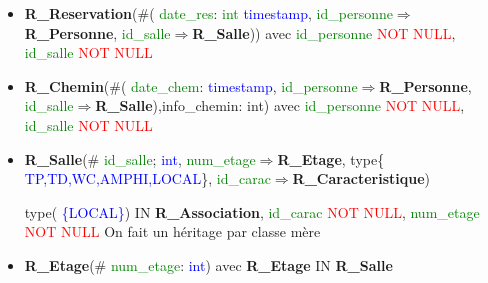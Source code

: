 \documentclass{article}
\begin{document}
\begin{itemize}
\item \textbf{R\_Reservation}(\#(\textcolor{green}{ date\_res}:\textcolor{green}{ int} \textcolor{blue}{ timestamp},\textcolor{green}{ id\_personne}$\Rightarrow$\textbf{R\_Personne},\textcolor{green}{ id\_salle}$\Rightarrow$\textbf{R\_Salle})) avec \textcolor{green}{ id\_personne} \textcolor{red}{NOT NULL},  \textcolor{green}{ id\_salle} \textcolor{red}{NOT NULL} \\

\item \textbf{R\_Chemin}(\#(\textcolor{green}{ date\_chem}: \textcolor{blue}{ timestamp},\textcolor{green}{ id\_personne}$\Rightarrow$\textbf{R\_Personne},\textcolor{green}{ id\_salle}$\Rightarrow$\textbf{R\_Salle}),info\_chemin: int) avec \textcolor{green}{ id\_personne} \textcolor{red}{NOT NULL}, \textcolor{green}{ id\_salle} \textcolor{red}{NOT NULL} \\

\item \textbf{R\_Salle}(\#\textcolor{green}{ id\_salle}; \textcolor{blue}{ int},\textcolor{green}{ num\_etage}$\Rightarrow$\textbf{R\_Etage}, type\{\textcolor{blue}{ TP,TD,WC,AMPHI,LOCAL}\},\textcolor{green}{ id\_carac}$\Rightarrow$\textbf{R\_Caracteristique})

type(\textcolor{blue}{ \{LOCAL\}}) IN \textbf{R\_Association}, \textcolor{green}{ id\_carac} \textcolor{red}{NOT NULL}, \textcolor{green}{ num\_etage} \textcolor{red}{NOT NULL}        On fait un héritage par classe mère\\

\item \textbf{R\_Etage}(\#\textcolor{green}{ num\_etage}: \textcolor{blue}{ int}) avec \textbf{R\_Etage} IN \textbf{R\_Salle}  \\

\end{itemize}
\end{document}
